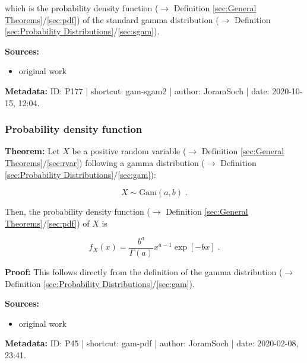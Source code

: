 \documentclass[a4paper,12pt,twoside]{book}
\begin{document}
which is the probability density function ($\rightarrow$ Definition \ref{sec:General Theorems}/\ref{sec:pdf}) of the standard gamma distribution ($\rightarrow$ Definition \ref{sec:Probability Distributions}/\ref{sec:sgam}).


\vspace{1em}
\textbf{Sources:}
\begin{itemize}
\item original work\end{itemize}


\vspace{1em}
\textbf{Metadata:} ID: P177 | shortcut: gam-sgam2 | author: JoramSoch | date: 2020-10-15, 12:04.
\vspace{1em}



\subsubsection[\textbf{Probability density function}]{Probability density function} \label{sec:gam-pdf}
\setcounter{equation}{0}

\textbf{Theorem:} Let $X$ be a positive random variable ($\rightarrow$ Definition \ref{sec:General Theorems}/\ref{sec:rvar}) following a gamma distribution ($\rightarrow$ Definition \ref{sec:Probability Distributions}/\ref{sec:gam}):

\begin{equation} \label{eq:gam-pdf-gam}
X \sim \mathrm{Gam}(a, b) \; .
\end{equation}

Then, the probability density function ($\rightarrow$ Definition \ref{sec:General Theorems}/\ref{sec:pdf}) of $X$ is

\begin{equation} \label{eq:gam-pdf-gam-pdf}
f_X(x) = \frac{b^a}{\Gamma(a)} x^{a-1} \exp[-b x] \; .
\end{equation}


\vspace{1em}
\textbf{Proof:} This follows directly from the definition of the gamma distribution ($\rightarrow$ Definition \ref{sec:Probability Distributions}/\ref{sec:gam}).


\vspace{1em}
\textbf{Sources:}
\begin{itemize}
\item original work\end{itemize}


\vspace{1em}
\textbf{Metadata:} ID: P45 | shortcut: gam-pdf | author: JoramSoch | date: 2020-02-08, 23:41.
\vspace{1em}
\end{document}

